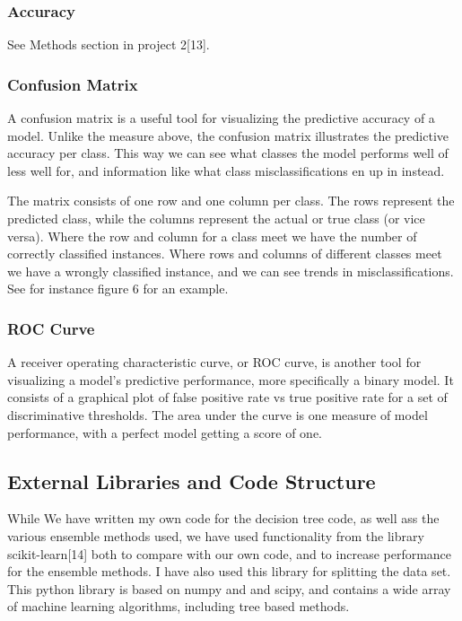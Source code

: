 \documentclass[11pt]{article}
\begin{document}
\hypertarget{accuracy}{%
\subsubsection{Accuracy}\label{accuracy}}
See Methods section in project 2[13].
\hypertarget{confusion-matrix}{%
\subsubsection{Confusion Matrix}\label{confusion-matrix}}
A confusion matrix is a useful tool for visualizing the predictive accuracy of a model. Unlike the measure above, the confusion matrix illustrates the predictive accuracy per class. This way we can see what classes the model performs well of less well for, and information like what class misclassifications en up in instead.

The matrix consists of one row and one column per class. The rows represent the predicted class, while the columns represent the actual or true class (or vice versa). Where the row and column for a class meet we have the number of correctly classified instances. Where rows and columns of different classes meet we have a wrongly classified instance, and we can see trends in misclassifications. See for instance figure 6 for an example. 

\hypertarget{roc-curve}{%
\subsubsection{ROC Curve}\label{roc-curve}}
A receiver operating characteristic curve, or ROC curve, is another tool for visualizing a model's predictive performance, more specifically a binary model. It consists of a graphical plot of false positive rate vs true positive rate for a set of discriminative thresholds. The area under the curve is one measure of model performance, with a perfect model getting a score of one.

\hypertarget{ext-lib}{%
	\subsection{External Libraries and Code Structure}\label{ext-lib}}

While We have written my own code for the decision tree code, as well ass the various ensemble methods used, we have used functionality from the library scikit-learn[14] both to compare with our own code, and to increase performance for the ensemble methods. I have also used this library for splitting the data set. This python library is based on
numpy and and scipy, and contains a wide array of machine learning algorithms, including tree based methods.
\end{document}
